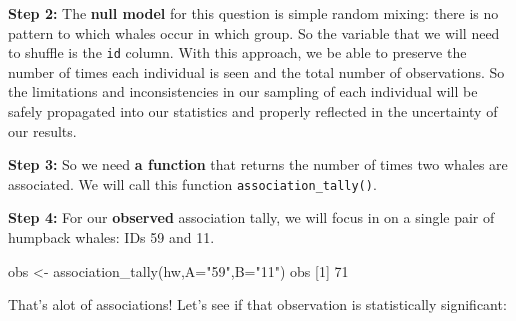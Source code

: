\documentclass[
]{book}
\newenvironment{Shaded}{\begin{snugshade}}{\end{snugshade}}
\newcommand{\AttributeTok}[1]{\textcolor[rgb]{0.77,0.63,0.00}{#1}}
\newcommand{\ControlFlowTok}[1]{\textcolor[rgb]{0.13,0.29,0.53}{\textbf{#1}}}
\newcommand{\DecValTok}[1]{\textcolor[rgb]{0.00,0.00,0.81}{#1}}
\newcommand{\FunctionTok}[1]{\textcolor[rgb]{0.00,0.00,0.00}{#1}}
\newcommand{\NormalTok}[1]{#1}
\newcommand{\OtherTok}[1]{\textcolor[rgb]{0.56,0.35,0.01}{#1}}
\newcommand{\SpecialCharTok}[1]{\textcolor[rgb]{0.00,0.00,0.00}{#1}}
\newcommand{\StringTok}[1]{\textcolor[rgb]{0.31,0.60,0.02}{#1}}
\begin{document}
\textbf{Step 2:} The \textbf{null model} for this question is simple random mixing: there is no pattern to which whales occur in which group. So the variable that we will need to shuffle is the \texttt{id} column. With this approach, we be able to preserve the number of times each individual is seen and the total number of observations. So the limitations and inconsistencies in our sampling of each individual will be safely propagated into our statistics and properly reflected in the uncertainty of our results.

\textbf{Step 3:} So we need \textbf{a function} that returns the number of times two whales are associated. We will call this function \texttt{association\_tally()}.

\begin{Shaded}
\end{Shaded}

\textbf{Step 4:} For our \textbf{observed} association tally, we will focus in on a single pair of humpback whales: IDs 59 and 11.

\begin{Shaded}
\begin{Highlighting}[]
\NormalTok{obs }\OtherTok{\textless{}{-}} \FunctionTok{association\_tally}\NormalTok{(hw,}\AttributeTok{A=}\StringTok{"59"}\NormalTok{,}\AttributeTok{B=}\StringTok{"11"}\NormalTok{)}
\NormalTok{obs}
\NormalTok{[}\DecValTok{1}\NormalTok{] }\DecValTok{71}
\end{Highlighting}
\end{Shaded}

That's alot of associations! Let's see if that observation is statistically significant:
\end{document}
